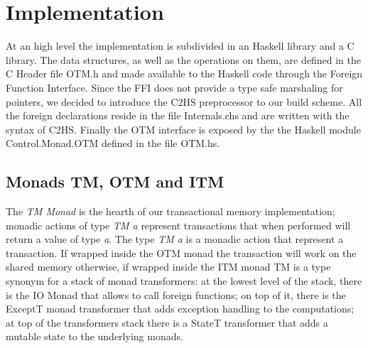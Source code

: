 
\chapter{Implementation}

At an high level the implementation is subdivided in an Haskell library and a C library.
The data structures, as well as the operations on them, are defined in the C Header file OTM.h and made available to the Haskell code through the Foreign Function Interface.
Since the FFI does not provide a type safe marshaling for pointers, we decided to introduce the C2HS preprocessor to our build scheme.
All the foreign declarations reside in the file Internals.chs and are written with the syntax of C2HS.\cite{Chakravarty2000}
Finally the OTM interface is exposed by the the Haskell module Control.Monad.OTM defined in the file OTM.hs.

\section{Monads TM, OTM and ITM}
The \emph{TM Monad} is the hearth of our transactional memory implementation; monadic actions of type \emph{TM a} represent transactions that when performed will return a value of type \emph{a}. 
The type \emph{TM a} is a monadic action that represent a transaction.
If wrapped inside the OTM monad the transaction will work on the shared memory otherwise, if wrapped inside the ITM monad
TM is a type synonym for a stack of monad transformers: at the lowest level of the stack, there is the IO Monad that allows to call foreign functions; on top of it, there is the ExceptT monad transformer that adds exception handling to the computations; at top of the transformers stack there is a StateT transformer that adds a mutable state to the underlying monads.
